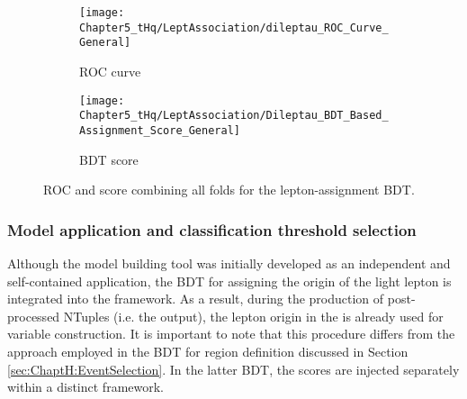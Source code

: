 \begin{figure}[htbp!]
  \begin{subfigure}[h]{0.4\linewidth}
  	\texttt{[image: Chapter5\_tHq/LeptAssociation/dileptau\_ROC\_Curve\_General]}
	\caption{ROC curve}
	\label{fig:dileptau:Assignment:ROC_and_Score:ROC}
  \end{subfigure}
  \begin{subfigure}[h]{0.6\linewidth}
	\texttt{[image: Chapter5\_tHq/LeptAssociation/Dileptau\_BDT\_Based\_Assignment\_Score\_General]}
	\caption{BDT score} 
	\label{fig:dileptau:Assignment:ROC_and_Score:Score}
  \end{subfigure}%
\caption{ROC and score combining all folds for the \dilepSStau lepton-assignment BDT.}
\label{fig:dileptau:Assignment:ROC_and_Score}
\end{figure}
		 


\subsubsection{Model application and classification threshold selection}
\label{sec:ChaptH:Sig:LepAsign:SS:BDT:Application}


Although the model building tool was initially developed as an independent 
and self-contained application, the BDT for assigning the origin of the light 
lepton is integrated into the \thqloop framework. As a result, during the production 
of post-processed NTuples (i.e. the \thqloop output), the lepton origin in the 
\dilepSStau is already used for variable construction. It is important to note 
that this procedure differs from the approach employed in the BDT for region 
definition discussed in Section \ref{sec:ChaptH:EventSelection}. In the latter BDT, 
the scores are injected separately within a distinct framework.

\begin{table}[]
\centering
{}
\caption{Different thresholds for lepton association compared to its correspondent accuracy.}
\label{tab:dileptau:Assignment_appendix:Thereshold}
\end{table}


